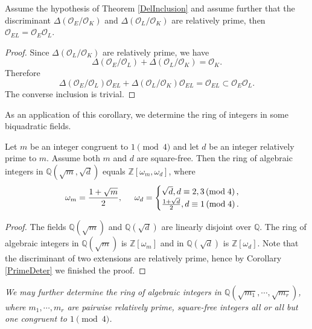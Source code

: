 \begin{corollary}\label{PrimeDeter}
Assume the hypothesis of Theorem \ref{DelInclusion} and assume further that the discriminant $\Delta(\mathcal{O}_E/\mathcal{O}_K)$ and $\Delta(\mathcal{O}_L/\mathcal{O}_K)$ are relatively prime, then $\mathcal{O}_{EL}=\mathcal{O}_E\mathcal{O}_L$.
\end{corollary}
\begin{proof}
Since $\Delta(\mathcal{O}_L/\mathcal{O}_K)$ are relatively prime, we have 
$$
\Delta \left( \mathcal{O} _E/\mathcal{O} _L \right) +\Delta \left( \mathcal{O} _L/\mathcal{O} _K \right) =\mathcal{O} _K.
$$
Therefore 
$$
\Delta \left( \mathcal{O} _E/\mathcal{O} _L \right) \mathcal{O} _{EL}+\Delta \left( \mathcal{O} _L/\mathcal{O} _K \right) \mathcal{O} _{EL}=\mathcal{O} _{EL}\subset \mathcal{O} _E\mathcal{O} _L.
$$
The converse inclusion is trivial.
\end{proof}
As an application of this corollary, we determine the ring of integers in some biquadratic fields.
\begin{theorem}
Let $m$ be an integer congruent to $1\pmod{4}$ and let $d$ be an integer relatively prime to $m$. Assume both $m$ and $d$ are square-free. Then the ring of algebraic integers in $\mathbb{Q}(\sqrt{m},\sqrt{d})$ equals $\mathbb{Z}[\omega_m,\omega_d]$, where 
$$
\omega _m=\frac{1+\sqrt{m}}{2},\hspace{0.5cm}\omega _d=\begin{cases}
	\sqrt{d},d\equiv 2,3\left( \mathrm{mod}\;4 \right) ,\\
	\frac{1+\sqrt{d}}{2},d\equiv 1\left( \mathrm{mod}\;4 \right) .\\
\end{cases}
$$
\end{theorem}
\begin{proof}
The fields $\mathbb{Q}(\sqrt{m})$ and $\mathbb{Q}(\sqrt{d})$ are linearly disjoint over $\mathbb{Q}$. The ring of algebraic integers in $\mathbb{Q}(\sqrt{m})$ is $\mathbb{Z}[\omega_m]$ and in $\mathbb{Q}(\sqrt{d})$ is $\mathbb{Z}[\omega_d]$. Note that the discriminant of two extensions are relatively prime, hence by Corollary \ref{PrimeDeter} we finished the proof.
\end{proof}
\begin{note}\em
We may further determine the ring of algebraic integers in $\mathbb{Q}(\sqrt{m_1},\cdots,\sqrt{m_r})$, where $m_1,\cdots,m_r$ are pairwise relatively prime, square-free integers all or all but one congruent to $1\pmod{4}$.
\end{note}
